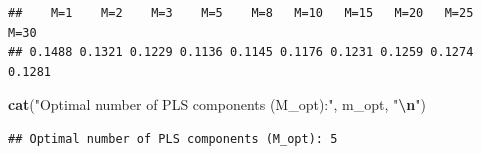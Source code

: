 \documentclass[
]{article}
\newenvironment{Shaded}{\begin{snugshade}}{\end{snugshade}}
\newcommand{\FunctionTok}[1]{\textcolor[rgb]{0.13,0.29,0.53}{\textbf{#1}}}
\newcommand{\NormalTok}[1]{#1}
\newcommand{\SpecialCharTok}[1]{\textcolor[rgb]{0.81,0.36,0.00}{\textbf{#1}}}
\newcommand{\StringTok}[1]{\textcolor[rgb]{0.31,0.60,0.02}{#1}}
\begin{document}
\begin{verbatim}
##    M=1    M=2    M=3    M=5    M=8   M=10   M=15   M=20   M=25   M=30 
## 0.1488 0.1321 0.1229 0.1136 0.1145 0.1176 0.1231 0.1259 0.1274 0.1281
\end{verbatim}

\begin{Shaded}
\begin{Highlighting}[]
\FunctionTok{cat}\NormalTok{(}\StringTok{"Optimal number of PLS components (M\_opt):"}\NormalTok{, m\_opt, }\StringTok{"}\SpecialCharTok{\textbackslash{}n}\StringTok{"}\NormalTok{)}
\end{Highlighting}
\end{Shaded}

\begin{verbatim}
## Optimal number of PLS components (M_opt): 5
\end{verbatim}
\end{document}
